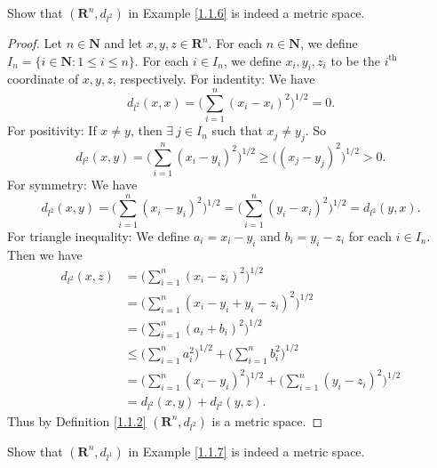 \begin{exercise}\label{ex 1.1.6}
    Show that \((\mathbf{R}^n, d_{l^2})\) in Example \ref{1.1.6} is indeed a metric space.
\end{exercise}

\begin{proof}
    Let \(n \in \mathbf{N}\) and let \(x, y, z \in \mathbf{R}^n\).
    For each \(n \in \mathbf{N}\), we define \(I_n = \{i \in \mathbf{N} : 1 \leq i \leq n\}\).
    For each \(i \in I_n\), we define \(x_i, y_i, z_i\) to be the \(i^{\text{th}}\) coordinate of \(x, y, z\), respectively.
    For indentity:
    We have
    \[
        d_{l^2}(x, x) = \bigg(\sum_{i = 1}^n (x_i - x_i)^2\bigg)^{1 / 2} = 0.
    \]
    For positivity:
    If \(x \neq y\), then \(\exists\ j \in I_n\) such that \(x_j \neq y_j\).
    So
    \[
        d_{l^2}(x, y) = \bigg(\sum_{i = 1}^n (x_i - y_i)^2\bigg)^{1 / 2} \geq \big((x_j - y_j)^2\big)^{1 / 2} > 0.
    \]
    For symmetry:
    We have
    \[
        d_{l^2}(x, y) = \bigg(\sum_{i = 1}^n (x_i - y_i)^2\bigg)^{1 / 2} = \bigg(\sum_{i = 1}^n (y_i - x_i)^2\bigg)^{1 / 2} = d_{l^2}(y, x).
    \]
    For triangle inequality:
    We define \(a_i = x_i - y_i\) and \(b_i = y_i - z_i\) for each \(i \in I_n\).
    Then we have
    \begin{align*}
        d_{l^2}(x, z) & = \bigg(\sum_{i = 1}^n (x_i - z_i)^2\bigg)^{1 / 2}                                                    \\
                      & = \bigg(\sum_{i = 1}^n (x_i - y_i + y_i - z_i)^2\bigg)^{1 / 2}                                        \\
                      & = \bigg(\sum_{i = 1}^n (a_i + b_i)^2\bigg)^{1 / 2}                                                    \\
                      & \leq \bigg(\sum_{i = 1}^n a_i^2\bigg)^{1 / 2} + \bigg(\sum_{i = 1}^n b_i^2\bigg)^{1 / 2}              \\
                      & = \bigg(\sum_{i = 1}^n (x_i - y_i)^2\bigg)^{1 / 2} + \bigg(\sum_{i = 1}^n (y_i - z_i)^2\bigg)^{1 / 2} \\
                      & = d_{l^2}(x, y) + d_{l^2}(y, z).
    \end{align*}
    Thus by Definition \ref{1.1.2} \((\mathbf{R}^n, d_{l^2})\) is a metric space.
\end{proof}

\begin{exercise}\label{ex 1.1.7}
    Show that \((\mathbf{R}^n, d_{l^1})\) in Example \ref{1.1.7} is indeed a metric space.
\end{exercise}

